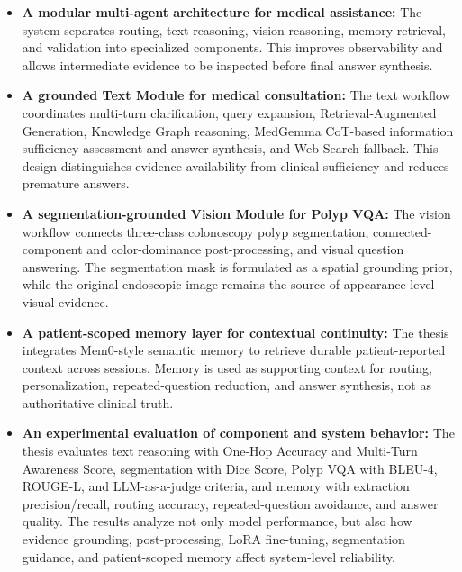 \begin{itemize}
    \item \textbf{A modular multi-agent architecture for medical assistance:} The system separates routing, text reasoning, vision reasoning, memory retrieval, and validation into specialized components. This improves observability and allows intermediate evidence to be inspected before final answer synthesis.

    \item \textbf{A grounded Text Module for medical consultation:} The text workflow coordinates multi-turn clarification, query expansion, Retrieval-Augmented Generation, Knowledge Graph reasoning, MedGemma CoT-based information sufficiency assessment and answer synthesis, and Web Search fallback. This design distinguishes evidence availability from clinical sufficiency and reduces premature answers.

    \item \textbf{A segmentation-grounded Vision Module for Polyp VQA:} The vision workflow connects three-class colonoscopy polyp segmentation, connected-component and color-dominance post-processing, and visual question answering. The segmentation mask is formulated as a spatial grounding prior, while the original endoscopic image remains the source of appearance-level visual evidence.

    \item \textbf{A patient-scoped memory layer for contextual continuity:} The thesis integrates Mem0-style semantic memory to retrieve durable patient-reported context across sessions. Memory is used as supporting context for routing, personalization, repeated-question reduction, and answer synthesis, not as authoritative clinical truth.

    \item \textbf{An experimental evaluation of component and system behavior:} The thesis evaluates text reasoning with One-Hop Accuracy and Multi-Turn Awareness Score, segmentation with Dice Score, Polyp VQA with BLEU-4, ROUGE-L, and LLM-as-a-judge criteria, and memory with extraction precision/recall, routing accuracy, repeated-question avoidance, and answer quality. The results analyze not only model performance, but also how evidence grounding, post-processing, LoRA fine-tuning, segmentation guidance, and patient-scoped memory affect system-level reliability.
\end{itemize}